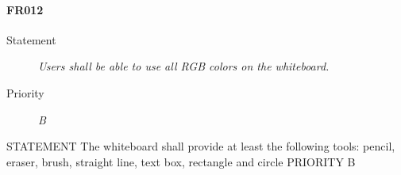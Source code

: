 \paragraph{FR012}
\begin{description}
  \item [Statement] 
  \textit{ Users shall be able to use all RGB colors on the whiteboard.}
\item [Priority] \textit{B}
\end{description}

STATEMENT The whiteboard shall provide at least the following tools: pencil, eraser, brush, straight line, text box, rectangle and circle
PRIORITY B
